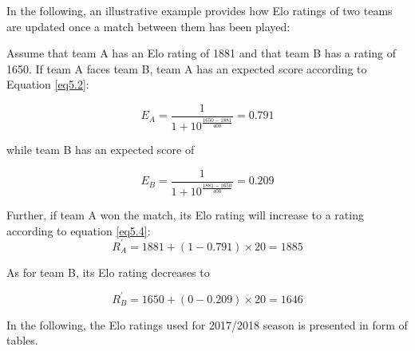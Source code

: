 \newpar

In the following, an illustrative example provides how Elo ratings of two teams are updated once a match between them has been played:

\newpar

Assume that team A has an Elo rating of 1881 and that team B has a rating of 1650. If team A faces team B, team A has an expected score according to Equation \ref{eq5.2}:

\begin{equation*}
    E_A = \frac{1}{1+10^{\frac{1650-1881}{400}}} = 0.791
\end{equation*}

while team B has an expected score of

\begin{equation*}
    E_B = \frac{1}{1+10^{\frac{1881-1650}{400}}} = 0.209
\end{equation*}

Further, if team A won the match, its Elo rating will increase to a rating according to equation \ref{eq5.4}: 
\begin{equation*}
   R^{'}_A= 1881 + (1-0.791) \times 20 = 1885
\end{equation*}

As for team B, its Elo rating decreases to

\begin{equation*}
   R^{'}_B = 1650 + (0-0.209) \times 20 = 1646 
\end{equation*}

In the following, the Elo ratings used for 2017/2018 season is presented in form of tables.

